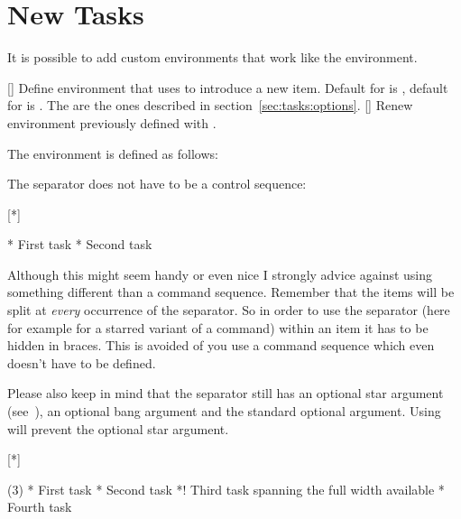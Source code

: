 \documentclass[load-preamble+]{cnltx-doc}
\begin{document}
\section{New Tasks}
It is possible to add custom environments that work like the 
environment.
\begin{commands}
  []
    Define environment  that uses  to introduce a
    new item.  Default for  is , default for
     is .  The  are the ones described in
    section~\ref{sec:tasks:options}.
  []
    Renew environment previously defined with .
\end{commands}
The  environment is defined as follows:
\begin{sourcecode}
\end{sourcecode}

The separator does not have to be a control sequence:
\begin{example}
  [*]
  \begin{done}
    * First task
    * Second task
  \end{done}
\end{example}
Although this might seem handy or even nice I strongly advice against using
something different than a command sequence. Remember that the items will be
split at \emph{every} occurrence of the separator.  So in order to use the
separator (here for example for a starred variant of a command) within an item
it has to be hidden in braces.  This is avoided of you use a command sequence
which even doesn't have to be defined.

Please also keep in mind that the separator still has an optional star
argument (see~\pageref{optional-star}), an optional bang argument and the
standard optional argument.  Using \code{*} will prevent the optional star
argument.

\begin{example}
  [*]
  \begin{done}(3)
    * First task
    * Second task
    *! Third task spanning the full width available
    * Fourth task
  \end{done}
\end{example}
\end{document}
